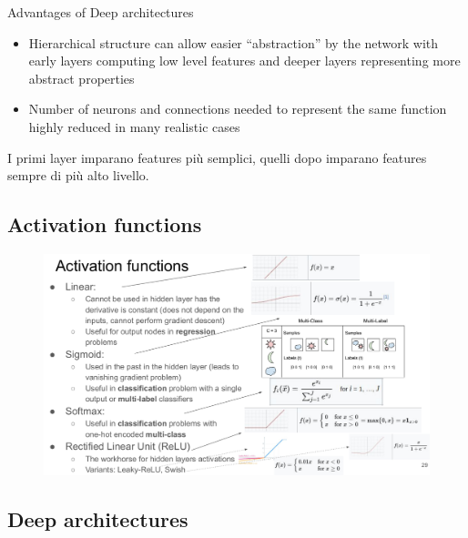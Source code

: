Advantages of Deep architectures

\begin{itemize}
	\item Hierarchical structure can allow easier “abstraction” by the network with early layers computing low level features and deeper layers representing more abstract properties 
	\item Number of neurons and connections needed to represent the same function highly reduced in many realistic cases
\end{itemize}
I primi layer imparano features più semplici, quelli dopo imparano features sempre di più alto livello.

\subsection{Activation functions}
\begin{figure}[ht]
	\centering
	\includegraphics[width=1\linewidth]{figure_ml/activation_functions.png}
\end{figure}
\FloatBarrier



\begin{tcolorbox}[width=\textwidth,colback={white},title={\textbf{18.} What is an activation function? Which examples do you know? Which activation functions should be used in the last layer of a Classification DNN? And for a  Regression? Can a linear activation be used in hidden layers?},colbacktitle=red,coltitle=black]
	

	
\end{tcolorbox}



\newpage
\subsection{Deep architectures}

